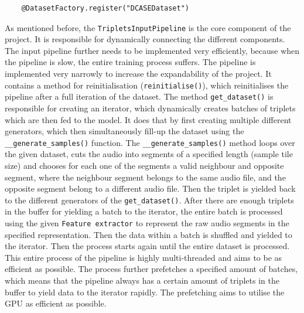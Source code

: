 \begin{verbatim}
    @DatasetFactory.register("DCASEDataset")
\end{verbatim}
As mentioned before, the \texttt{TripletsInputPipeline} is the core component of the project. It is responsible for dynamically connecting the different components. The input pipeline further needs to be implemented very efficiently, because when the pipeline is slow, the entire training process suffers. The pipeline is implemented very narrowly to increase the expandability of the project. It contains a method for reinitialisation (\texttt{reinitialise()}), which reinitialises the pipeline after a full iteration of the dataset.
\newline
\newline
The method \texttt{get\_dataset()} is responsible for creating an iterator, which dynamically creates batches of triplets which are then fed to the model. It does that by first creating multiple different generators, which then simultaneously fill-up the dataset using the \texttt{\_\_generate\_samples()} function. The \texttt{\_\_generate\_samples()} method loops over the given dataset, cuts the audio into segments of a specified length (sample tile size) and chooses for each one of the segments a valid neighbour and opposite segment, where the neighbour segment belongs to the same audio file, and the opposite segment belong to a different audio file. Then the triplet is yielded back to the different generators of the \texttt{get\_dataset()}. After there are enough triplets in the buffer for yielding a batch to the iterator, the entire batch is processed using the given \texttt{Feature extractor} to represent the raw audio segments in the specified representation. Then the data within a batch is shuffled and yielded to the iterator. Then the process starts again until the entire dataset is processed. 
\newline
\newline
This entire process of the pipeline is highly multi-threaded and aims to be as efficient as possible. The process further prefetches a specified amount of batches, which means that the pipeline always has a certain amount of triplets in the buffer to yield data to the iterator rapidly. The prefetching aims to utilise the \gls{GPU} as efficient as possible.

